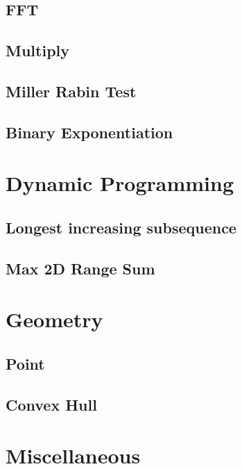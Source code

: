 \subsection{FFT}
\raggedbottom
\hrulefill
\subsection{Multiply}
\raggedbottom
\hrulefill
\subsection{Miller Rabin Test}
\raggedbottom
\hrulefill
\subsection{Binary Exponentiation}
\raggedbottom
\hrulefill

\section{Dynamic Programming}
\subsection{Longest increasing subsequence}
\raggedbottom
\hrulefill
\subsection{Max 2D Range Sum}
\raggedbottom
\hrulefill

\section{Geometry}
\subsection{Point}
\raggedbottom
\hrulefill
\subsection{Convex Hull}
\raggedbottom
\hrulefill

\section{Miscellaneous}

